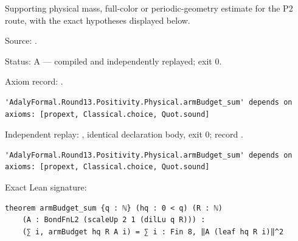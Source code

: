 \begin{theorem}[bp-491]
\label{bp-491}
\leanok
Supporting physical mass, full-color or periodic-geometry estimate for the P2 route, with the exact hypotheses displayed below.

\par Source: \texttt{}.
\par Status: A — compiled and independently replayed; exit 0.
\par Axiom record: \texttt{}.
\begin{verbatim}
'AdalyFormal.Round13.Positivity.Physical.armBudget_sum' depends on axioms: [propext, Classical.choice, Quot.sound]
\end{verbatim}
\par Independent replay: \texttt{}, identical declaration body, exit 0; record \texttt{}.
\begin{verbatim}
'AdalyFormal.Round13.Positivity.Physical.armBudget_sum' depends on axioms: [propext, Classical.choice, Quot.sound]
\end{verbatim}
\par Exact Lean signature:
\begin{verbatim}
theorem armBudget_sum {q : ℕ} (hq : 0 < q) (R : ℕ)
    (A : BondFnL2 (scaleUp 2 1 (dilLu q R))) :
    (∑ i, armBudget hq R A i) = ∑ i : Fin 8, ‖A (leaf hq R i)‖^2
\end{verbatim}
\end{theorem}

